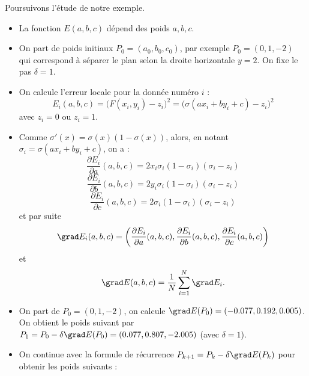 \begin{exemple}{}{}
	Poursuivons l'étude de notre exemple.
	\begin{itemize}
		\item La fonction $E(a,b,c)$ dépend des poids $a,b,c$.
		
		\item On part de poids initiaux $P_0 = (a_0,b_0,c_0)$, par exemple $P_0 = (0,1,-2)$ qui correspond à séparer le plan selon la droite horizontale $y=2$. 
		On fixe le pas $\delta = 1$.
		
		\item On calcule l'erreur locale pour la donnée numéro $i$ :
		$$E_i(a,b,c) = \big( F(x_i,y_i) - z_i \big)^2 = \big( \sigma(ax_i + by_i + c) - z_i \big)^2$$
		avec $z_i = 0$ ou $z_i=1$.
		
		\item Comme $\sigma'(x)= \sigma(x)(1-\sigma(x))$, alors, en notant $\sigma_i = \sigma(ax_i+by_i+c)$, on a :
		$$\frac{\partial E_i}{\partial a}(a,b,c) = 2 x_i  \sigma_i(1-\sigma_i)(\sigma_i - z_i)$$
		$$\frac{\partial E_i}{\partial b}(a,b,c) = 2 y_i \sigma_i(1-\sigma_i)(\sigma_i - z_i)$$
		$$\frac{\partial E_i}{\partial c}(a,b,c) = 2 \sigma_i(1-\sigma_i)(\sigma_i - z_i)$$ 
		et par suite 
			$$\grad E_i(a,b,c) = \left(\frac{\partial E_i}{\partial a}(a,b,c), \frac{\partial E_i}{\partial b}(a,b,c), \frac{\partial E_i}{\partial c}(a,b,c) \right)$$
et
			$$\grad E(a,b,c) = \frac{1}{N} \sum_{i=1}^N \grad E_i.$$
		
		
		\item On part de $P_0 = (0,1,-2)$, on calcule $\grad E(P_0) = (-0.077, 0.192, 0.005)$. On obtient le poids suivant par $P_1 = P_0 - \delta \grad E(P_0) = (0.077,    0.807,    -2.005)$ (avec $\delta = 1$).   
		
		\item On continue avec la formule de récurrence $P_{k+1} = P_k - \delta \grad E(P_k)$ pour obtenir les poids suivants :
		

\end{itemize}
\end{exemple}
